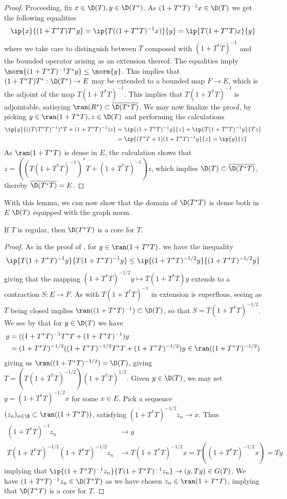 \begin{proof}
Proceeding, fix $x\in \D(T),y\in \D(T^*)$. As $(1+T^*T)^{-1}x\in \D(T)$ we get the following equalities
\begin{align*}
	\ip{x}{(1+T^*T)T^*y}=\ip{T((1+T^*T)^{-1}x)}{y}=\ip{T(1+T^*T)x}{y}
\end{align*}
where we take care to distinguish between $T$ composed with $(1+T^*T)^{-1}$ and the bounded operator arising as an extension thereof. The equalities imply $\norm{(1+T^*T)^{-1}T^*y}\leq \norm{y}$. This implies that $(1+T^*T)T^*:\D(T^*)\to E$ may be extended to a bounded map $F\to E$, which is the adjoint of the map $T(1+T^*T)^{-1}$. This implies that $T(1+T^*T)^{-1}$ is adjointable, satisying $\ran(R^*)\subset \overline{\D(T^*T)}$. We may now finalize the proof, by picking $y\in \ran(1+T^*T),z\in \D(T)$ and performing the calculations
\begin{align*}
	\ip{y}{((T(T^*T)^{-1})^*T+(1+T^*T)^{-1})z}&=\ip{(1+T^*T)^{-1}y}{z}+\ip{T(1+T^*T)^{-1}y}{Tz} \\
	&=\ip{(T^*T+1)(1+T^*T)^{-1}y}{z}=\ip{y}{z}
\end{align*}
As $\ran(1+T^*T)$ is dense in $E$, the calculation shows that $z=((T(1+T^*T)^{-1})^*T+(1+T^*T)^{-1})z$, which implies $\D(T)\subset \overline{\D(T^*T)}$, thereby $\overline{\D(T^*T)}=E$. 
\end{proof}
With this lemma, we can now show that the domain of $\D(T^*T)$ is dense both in $E$ $\D(T)$ equipped with the graph norm. 
\begin{lemma}
	If $T$ is regular, then $\D(T^*T)$ is a core for $T$. 
\end{lemma}
\begin{proof}
	As in the proof of , for $y\in \ran(1+T^*T)$. we have the inequality
	\begin{align*}
		\ip{T(1+T^*T)^{-1}y}{T(1+T^*T)^{-1}y}\leq \ip{(1+T^*T)^{-1/2}y}{(1+T^*T)^{-1/2}y}
	\end{align*}
	giving that the mapping $(1+T^*T)^{-1/2}y\mapsto T(1+T^*T)y$ extends to a contraction $S:E\to F$. As with $T(1+T^*T)^{-1}$ in  extension is superflous, seeing as $T$ being closed implies $\ran((1+T^*T)^{-1})\subset \D(T)$, so that $S=T(1+T^*T)^{-1/2}$. We see by  that for $y\in \D(T)$ we have 
	\begin{align*}
		y&=((1+T^*T)^{-1}T^*T+(1+T^*T)^{-1})y \\
		&=(1+T^*T)^{-1/2}((1+T^*T)^{-1/2}T^*T+(1+T^*T)^{-1/2})y\in \ran((1+T^*T)^{-1/2})
	\end{align*}
	giving us $\ran((1+T^*T)^{-1/2})=\D(T)$, giving $T=(T(1+T^*T)^{-1/2})(1+T^*T)^{1/2}$. 
	Given $y\in \D(T)$, we may set $y=(1+T^*T)^{-1/2}x$ for some $x\in E$. Pick a sequence $(z_n)_{n\in \N}\subset \ran((1+T^*T))$, satisfying $(1+T^*T)^{-1/2}z_n\to x$. Thus  
	\begin{align*}
		(1+T^*T)^{-1}z_n &\to y\\
		T(1+T^*T)^{-1/2}(1+T^*T)^{-1/2}z_n&\to T(1+T^*T)^{-1/2}x=T((1+T^*T)^{-1/2}x)=Ty
	\end{align*}
	implying that $\ip{(1+T^*T)^{-1}z_n}{T(1+T^*T)^{-1}z_n}\to (y,Ty)\in G(T)$. We have $(1+T^*T)^{-1}z_n\in \D(T^*T)$ as we have chosen $z_n\in \ran(1+T^*T)$, implying that $\D(T^*T)$ is a core for $T$. 
\end{proof}
